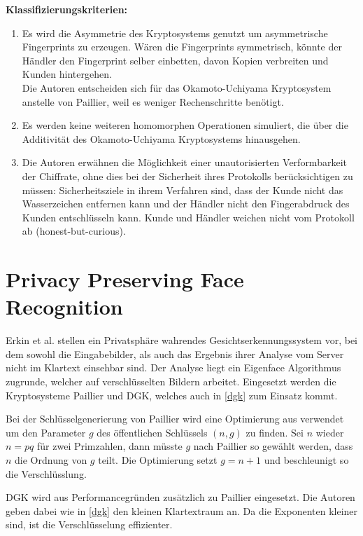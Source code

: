 \textbf{Klassifizierungskriterien:}
\begin{enumerate}
	\item Es wird die Asymmetrie des Kryptosystems genutzt um asymmetrische Fingerprints zu erzeugen. Wären die Fingerprints symmetrisch, könnte der Händler den Fingerprint selber einbetten, davon Kopien verbreiten und Kunden hintergehen.\\
	Die Autoren entscheiden sich für das Okamoto-Uchiyama Kryptosystem anstelle von Paillier, weil es weniger Rechenschritte benötigt.
	\item Es werden keine weiteren homomorphen Operationen simuliert, die über die Additivität des Okamoto-Uchiyama Kryptosystems hinausgehen.
	\item Die Autoren erwähnen die Möglichkeit einer unautorisierten Verformbarkeit der Chiffrate, ohne dies bei der Sicherheit ihres Protokolls berücksichtigen zu müssen: Sicherheitsziele in ihrem Verfahren sind, dass der Kunde nicht das Wasserzeichen entfernen kann und der Händler nicht den Fingerabdruck des Kunden entschlüsseln kann. Kunde und Händler weichen nicht vom Protokoll ab (honest-but-curious).
\end{enumerate}

\section{Privacy Preserving Face Recognition \cite{erkin2009privacy} }
\label{PPFR}

Erkin et al. stellen ein Privatsphäre wahrendes Gesichtserkennungssystem vor, bei dem sowohl die Eingabebilder, als auch das Ergebnis ihrer Analyse vom Server nicht im Klartext einsehbar sind. Der Analyse liegt ein Eigenface Algorithmus zugrunde, welcher auf verschlüsselten Bildern arbeitet. Eingesetzt werden die Kryptosysteme Paillier und DGK, welches auch in \ref{dgk} zum Einsatz kommt.

Bei der Schlüsselgenerierung von Paillier wird eine Optimierung aus \cite[p.16]{damgaard2001generalisation} verwendet um den Parameter $g$ des öffentlichen Schlüssels $(n,g)$ zu finden. Sei $n$ wieder $n=pq$ für zwei Primzahlen, dann müsste $g$ nach Paillier \cite{paillier1999public} so gewählt werden, dass $n$ die Ordnung von $g$ teilt. Die Optimierung setzt $g=n+1$ und beschleunigt so die Verschlüsslung.

DGK wird aus Performancegründen zusätzlich zu Paillier eingesetzt. Die Autoren geben dabei wie in \ref{dgk} den kleinen Klartextraum an. Da die Exponenten kleiner sind, ist die Verschlüsselung effizienter.

